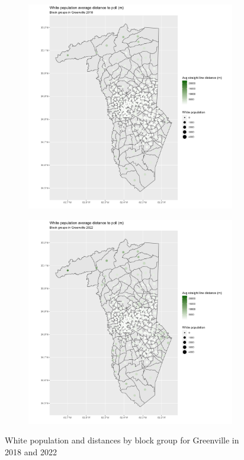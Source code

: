 \documentclass[11pt]{article}
\theoremstyle{remark}
\theoremstyle{definition}
\begin{document}
\begin{figure}
	\begin{subfigure}{.5\textwidth}
		\centering
		\includegraphics[width=\linewidth]{result_analysis/Greenville_County_SC_original_configs/white_pop_and_dist_Greenville_config_original_2018_polls.png}
		\label{sfig:York_2018_bg_dist_pop}
	\end{subfigure} 
	\begin{subfigure}{.5\textwidth}
		\centering
		\includegraphics[width=\linewidth]{result_analysis/Greenville_County_SC_original_configs/white_pop_and_dist_Greenville_config_original_2022_polls.png}
		\label{sfig:Greenville_2022_bg_dist}
	\end{subfigure}
	\caption{White population and distances by block group for Greenville in 2018 and 2022}
	\label{fig:Greenville distance White population maps}
\end{figure}
\end{document}
